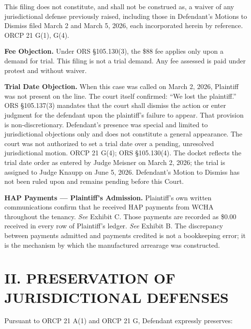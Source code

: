 \documentclass[12pt,letterpaper]{article}
\begin{document}
	This filing does not constitute, and shall not be construed as, a waiver of any jurisdictional defense previously raised, including those in Defendant's Motions to Dismiss filed March 2 and March 5, 2026, each incorporated herein by reference. ORCP 21 G(1), G(4).
	
	\textbf{Fee Objection.} Under ORS \S105.130(3), the \$88 fee applies only upon a demand for trial. This filing is not a trial demand. Any fee assessed is paid under protest and without waiver.
	
	\textbf{Trial Date Objection.} When this case was called on March 2, 2026, Plaintiff was not present on the line. The court itself confirmed: ``We lost the plaintiff.'' ORS \S105.137(3) mandates that the court shall dismiss the action or enter judgment for the defendant upon the plaintiff's failure to appear. That provision is non-discretionary. Defendant's presence was special and limited to jurisdictional objections only and does not constitute a general appearance. The court was not authorized to set a trial date over a pending, unresolved jurisdictional motion. ORCP 21 G(4); ORS \S105.130(4). The docket reflects the trial date order as entered by Judge Meisner on March 2, 2026; the trial is assigned to Judge Knaupp on June 5, 2026. Defendant's Motion to Dismiss has not been ruled upon and remains pending before this Court.
	
	\textbf{HAP Payments --- Plaintiff's Admission.} Plaintiff's own written communications confirm that he received HAP payments from WCHA throughout the tenancy. \textit{See} Exhibit C. Those payments are recorded as \$0.00 received in every row of Plaintiff's ledger. \textit{See} Exhibit B. The discrepancy between payments admitted and payments credited is not a bookkeeping error; it is the mechanism by which the manufactured arrearage was constructed.
	
	\section*{II. PRESERVATION OF JURISDICTIONAL DEFENSES}
	
	Pursuant to ORCP 21 A(1) and ORCP 21 G, Defendant expressly preserves:
	
\end{document}

